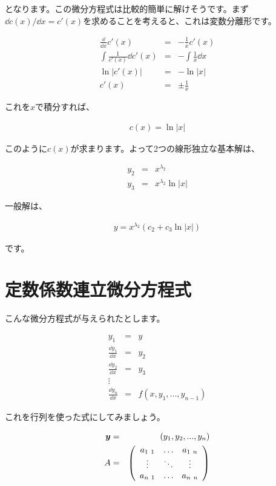 \noindent
となります。この微分方程式は比較的簡単に解けそうです。まず$\dd c(x)/\dd x=c'(x)$を求めることを考えると、これは変数分離形です。

\begin{eqnarray}
    \frac{\dd}{\dd x}c'(x)&=&-\frac{1}{x}c'(x) \\
    \int \frac{1}{c'(x)}\dd c'(x)&=&-\int\frac{1}{x}\dd x \nonumber \\
    \ln|c'(x)|&=&-\ln|x| \nonumber \\
    c'(x)&=&\pm\frac{1}{x}
\end{eqnarray}

\noindent
これを$x$で積分すれば、

\begin{eqnarray}
    c(x)=\ln|x|
\end{eqnarray}

\noindent
このように$c(x)$が求まります。よって2つの線形独立な基本解は、

\begin{eqnarray}
    y_2&=&x^{\lambda_2} \nonumber \\
    y_3&=&x^{\lambda_2}\ln|x|
\end{eqnarray}

一般解は、

\begin{eqnarray}
    y=x^{\lambda_2}(c_2+c_3\ln|x|)
\end{eqnarray}

\noindent
です。










\section{定数係数連立微分方程式}
\label{multiple}
こんな微分方程式が与えられたとします。

\begin{eqnarray}
y_1&=&y \nonumber \\
\frac{\dd y_1}{\dd x}&=&y_2 \nonumber \\
\frac{\dd y_2}{\dd x}&=&y_3 \nonumber \\
\vdots \nonumber\\
\frac{\dd y_n}{\dd x}&=&f(x,y_1,...,y_{n-1})
\end{eqnarray}

これを行列を使った式にしてみましょう。

\begin{eqnarray}
    \boldsymbol{y}&=&(y_1,y_2,...,y_n) \\
    A&=&\pqty{\begin{array}{ccc}
        a_{1\ 1} & \hdots & a_{1\ n} \\
        \vdots & \ddots & \vdots \\
        a_{n\ 1} & \hdots & a_{n\ n}
    \end{array}}
\end{eqnarray}

